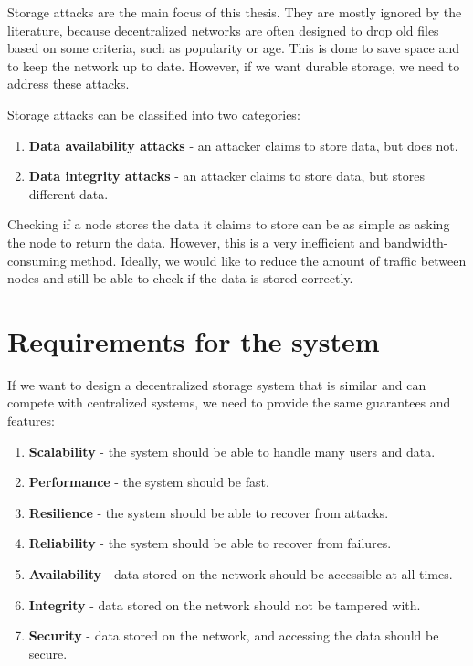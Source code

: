 Storage attacks are the main focus of this thesis.
They are mostly ignored by the literature, because decentralized networks are often designed to
drop old files based on some criteria, such as popularity or age.
This is done to save space and to keep the network up to date.
However, if we want durable storage, we need to address these attacks.

Storage attacks can be classified into two categories:
\begin{enumerate}
    \item \textbf{Data availability attacks} - an attacker claims to store data, but does not.
    \item \textbf{Data integrity attacks} - an attacker claims to store data, but stores different data.
\end{enumerate}

Checking if a node stores the data it claims to store can be as simple as asking the node to return the data.
However, this is a very inefficient and bandwidth-consuming method.
Ideally, we would like to reduce the amount of traffic between nodes and still be able to check
if the data is stored correctly.

\section{Requirements for the system}

If we want to design a decentralized storage system that is similar and can compete with centralized systems,
we need to provide the same guarantees and features:
\begin{enumerate}
    \item \textbf{Scalability} - the system should be able to handle many users and data.
    \item \textbf{Performance} - the system should be fast.
    \item \textbf{Resilience} - the system should be able to recover from attacks.
    \item \textbf{Reliability} - the system should be able to recover from failures.
    \item \textbf{Availability} - data stored on the network should be accessible at all times.
    \item \textbf{Integrity} - data stored on the network should not be tampered with.
    \item \textbf{Security} - data stored on the network, and accessing the data should be secure.
\end{enumerate}

